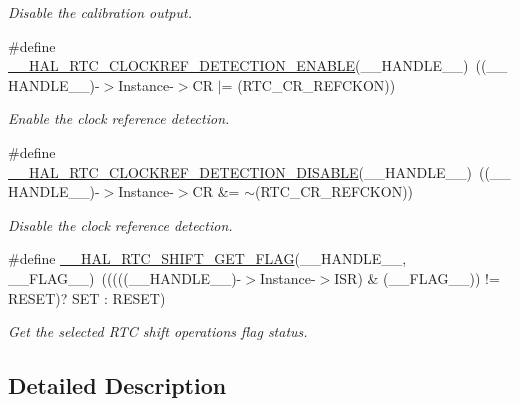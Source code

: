 \begin{DoxyCompactItemize}
\begin{DoxyCompactList}\small\item\em Disable the calibration output. \end{DoxyCompactList}\item 
\#define \hyperlink{group___r_t_c_ex___calibration_ga3fcacefb24751dcb772582e59e50de5e}{\+\_\+\+\_\+\+H\+A\+L\+\_\+\+R\+T\+C\+\_\+\+C\+L\+O\+C\+K\+R\+E\+F\+\_\+\+D\+E\+T\+E\+C\+T\+I\+O\+N\+\_\+\+E\+N\+A\+B\+LE}(\+\_\+\+\_\+\+H\+A\+N\+D\+L\+E\+\_\+\+\_\+)~((\+\_\+\+\_\+\+H\+A\+N\+D\+L\+E\+\_\+\+\_\+)-\/$>$Instance-\/$>$CR $\vert$= (R\+T\+C\+\_\+\+C\+R\+\_\+\+R\+E\+F\+C\+K\+ON))
\begin{DoxyCompactList}\small\item\em Enable the clock reference detection. \end{DoxyCompactList}\item 
\#define \hyperlink{group___r_t_c_ex___calibration_ga8e989c42c1f4139cc1e021c42638d86b}{\+\_\+\+\_\+\+H\+A\+L\+\_\+\+R\+T\+C\+\_\+\+C\+L\+O\+C\+K\+R\+E\+F\+\_\+\+D\+E\+T\+E\+C\+T\+I\+O\+N\+\_\+\+D\+I\+S\+A\+B\+LE}(\+\_\+\+\_\+\+H\+A\+N\+D\+L\+E\+\_\+\+\_\+)~((\+\_\+\+\_\+\+H\+A\+N\+D\+L\+E\+\_\+\+\_\+)-\/$>$Instance-\/$>$CR \&= $\sim$(R\+T\+C\+\_\+\+C\+R\+\_\+\+R\+E\+F\+C\+K\+ON))
\begin{DoxyCompactList}\small\item\em Disable the clock reference detection. \end{DoxyCompactList}\item 
\#define \hyperlink{group___r_t_c_ex___calibration_ga5e1482310c213248d8416b24a5e6b3f3}{\+\_\+\+\_\+\+H\+A\+L\+\_\+\+R\+T\+C\+\_\+\+S\+H\+I\+F\+T\+\_\+\+G\+E\+T\+\_\+\+F\+L\+AG}(\+\_\+\+\_\+\+H\+A\+N\+D\+L\+E\+\_\+\+\_\+,  \+\_\+\+\_\+\+F\+L\+A\+G\+\_\+\+\_\+)~(((((\+\_\+\+\_\+\+H\+A\+N\+D\+L\+E\+\_\+\+\_\+)-\/$>$Instance-\/$>$I\+SR) \& (\+\_\+\+\_\+\+F\+L\+A\+G\+\_\+\+\_\+)) != R\+E\+S\+ET)? S\+ET \+: R\+E\+S\+ET)
\begin{DoxyCompactList}\small\item\em Get the selected R\+TC shift operation\textquotesingle{}s flag status. \end{DoxyCompactList}\end{DoxyCompactItemize}


\subsection{Detailed Description}


